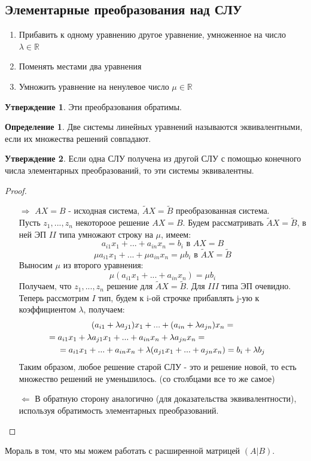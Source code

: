 \documentclass[a4paper, 12pt]{article}
\newcommand{\R}{\mathbb R}
\newcommand\tab[1][.5cm]{\hspace*{#1}}
\theoremstyle{definition}
\newtheorem*{definition}{Определение}
\newtheorem*{subtheorem}{Утверждение}
\begin{document}
    \subsection{Элементарные преобразования над СЛУ}
    \begin{enumerate}
      \item Прибавить к одному уравнению другое уравнение, умноженное на число $\lambda \in \R$
      \item Поменять местами два уравнения
      \item Умножить уравнение на ненулевое число $\mu \in \R$
    \end{enumerate}
    \begin{subtheorem}
      Эти преобразования обратимы.
    \end{subtheorem}
    \begin{definition}
      Две системы линейных уравнений называются эквивалентными, если их множества решений совпадают.
    \end{definition}
    \begin{subtheorem}
      Если одна СЛУ получена из другой СЛУ с помощью конечного числа элементарных преобразований, то эти системы эквивалентны.
    \end{subtheorem}
    \begin{proof} \tab
      \begin{itemize}
        \item[\underline{$\Longrightarrow$}]
        $AX = B$ - исходная система, $\tilde{A} X = \tilde{B}$ преобразованная система. \\
        Пусть ${z_1,...,z_n}$ некотороое решение $AX = B$. Будем рассматривать $\tilde{A} X = \tilde{B}$, в ней ЭП $II$ типа умножают строку на $\mu$, имеем:
        $$a_{i1}x_1 +...+ a_{in}x_n = b_{i} \text{ в } AX = B$$
        $$\mu a_{i1}x_1 +...+\mu a_{in}x_n = \mu b_i \text{ в } \tilde{A} X = \tilde{B}$$ 
        Выносим $\mu$ из второго уравнения:
        $$\mu (a_{i1}x_1 +...+ a_{in}x_n) = \mu b_i$$
        Получаем, что ${z_1,...,z_n}$ решение для $\tilde{A} X = \tilde{B}$. Для $III$ типа ЭП очевидно. Теперь рассмотрим $I$ тип, будем к i-ой строчке прибавлять j-ую к коэффициентом $\lambda$, получаем:
        \begin{multline*}
        (a_{i1}+\lambda a_{j1})x_1 +...+(a_{in}+\lambda a_{jn})x_n = \\ = a_{i1}x_1+\lambda a_{j1}x_1 +...+a_{in}x_n+\lambda a_{jn}x_n = \tab[3cm] \\ = a_{i1}x_1 + ... + a_{in}x_n + \lambda (a_{j1}x_1 +...+ a_{jn}x_n) = b_i + \lambda b_j
        \end{multline*}
        Таким образом, любое решение старой СЛУ - это и решение новой, то есть множество
        решений не уменьшилось. (со столбцами все то же самое)
        \item[\underline{$\Longleftarrow$}]
        В обратную сторону аналогично (для доказательства эквивалентности), используя обратимость элементарных преобразований.
      \end{itemize}
    \end{proof}
    Мораль в том, что мы можем работать с расширенной матрицей $(A|B)$.
\end{document}
